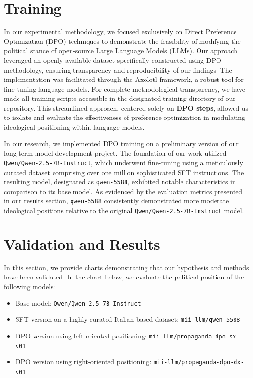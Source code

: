 \documentclass{article}
\begin{document}
\section{Training}
In our experimental methodology, we focused exclusively on Direct Preference Optimization (DPO) techniques to demonstrate the feasibility of modifying the political stance of open-source Large Language Models (LLMs). Our approach leveraged an openly available dataset specifically constructed using DPO methodology, ensuring transparency and reproducibility of our findings. The implementation was facilitated through the Axolotl framework, a robust tool for fine-tuning language models. For complete methodological transparency, we have made all training scripts accessible in the designated training directory of our repository. This streamlined approach, centered solely on \textbf{DPO steps}, allowed us to isolate and evaluate the effectiveness of preference optimization in modulating ideological positioning within language models.

In our research, we implemented DPO training on a preliminary version of our long-term model development project. The foundation of our work utilized \texttt{Qwen/Qwen-2.5-7B-Instruct}, which underwent fine-tuning using a meticulously curated dataset comprising over one million sophisticated SFT instructions. The resulting model, designated as \texttt{qwen-5588}, exhibited notable characteristics in comparison to its base model. As evidenced by the evaluation metrics presented in our results section, \texttt{qwen-5588} consistently demonstrated more moderate ideological positions relative to the original \texttt{Qwen/Qwen-2.5-7B-Instruct} model.

\section{Validation and Results}

In this section, we provide charts demonstrating that our hypothesis and methods have been validated. In the chart below, we evaluate the political position of the following models:
\begin{itemize}
    \item Base model: \texttt{Qwen/Qwen-2.5-7B-Instruct}
    \item SFT version on a highly curated Italian-based dataset: \texttt{mii-llm/qwen-5588}
    \item DPO version using left-oriented positioning: \texttt{mii-llm/propaganda-dpo-sx-v01}
    \item DPO version using right-oriented positioning: \texttt{mii-llm/propaganda-dpo-dx-v01}
\end{itemize}
\end{document}
